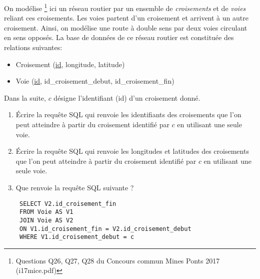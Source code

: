 On modélise \footnote{Questions Q26, Q27, Q28 du Concours commun Mines Ponts 2017 (i17mice.pdf)} ici un réseau routier par un ensemble de \emph{croisements} et de \emph{voies} reliant ces croisements. Les voies partent d'un croisement et arrivent à un autre croisement. Ainsi, on modélise une route à double sens par deux voies circulant en sens opposés.\newline
La base de données de ce réseau routier est constituée des relations suivantes:
\begin{itemize}
 \item Croisement (\underline{id}, longitude, latitude)
 \item Voie (\underline{id}, id\_croisement\_debut, id\_croisement\_fin)
\end{itemize}

Dans la suite, $c$ désigne l'identifiant (id) d'un croisement donné.
\begin{enumerate}
 \item \'Ecrire la requête SQL qui renvoie les identifiants des croisements que l'on peut atteindre à partir du croisement identifié par $c$ en utilisant une seule voie.
 \item \'Ecrire la requête SQL qui renvoie les longitudes et latitudes des croisements que l'on peut atteindre à partir du croisement identifié par $c$ en utilisant une seule voie.
 \item Que renvoie la requête SQL suivante ?
\begin{verbatim}
 SELECT V2.id_croisement_fin
 FROM Voie AS V1
 JOIN Voie AS V2
 ON V1.id_croisement_fin = V2.id_croisement_debut
 WHERE V1.id_croisement_debut = c
\end{verbatim}

\end{enumerate}
